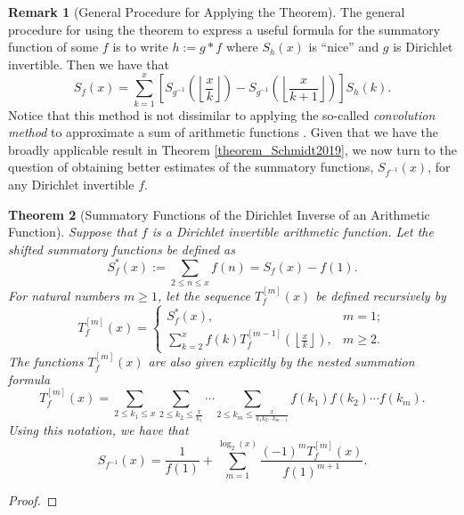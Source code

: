 \documentclass[11pt,reqno]{amsart}
\numberwithin{figure}{section}
\numberwithin{table}{section}
\newcommand{\floor}[1]{\left\lfloor #1 \right\rfloor}
\theoremstyle{plain}
\newtheorem{theorem}{Theorem}
\numberwithin{theorem}{section}
\theoremstyle{definition}
\newtheorem{remark}[theorem]{Remark}
\begin{document}
\begin{remark}[General Procedure for Applying the Theorem]
The general procedure for using the theorem to express a useful formula for the summatory 
function of some $f$ is to write $h := g \ast f$ where $S_h(x)$ is ``nice'' and $g$ is Dirichlet 
invertible. Then we have that 
\begin{equation}
\label{eqn_Sfx_hEQgAstfCvl_ident} 
S_f(x) = \sum_{k=1}^{x} \left[S_{g^{-1}}\left(\floor{\frac{x}{k}}\right) - 
     S_{g^{-1}}\left(\floor{\frac{x}{k+1}}\right)\right] S_h(k). 
\end{equation} 
Notice that this method is not dissimilar to applying the so-called 
\emph{convolution method} to approximate a sum of arithmetic functions 
\cite{TODO-CVLMETHOD-CROOT}. 
Given that we have the broadly applicable result in Theorem \ref{theorem_Schmidt2019}, 
we now turn to the question of obtaining better estimates of the summatory functions, 
$S_{f^{-1}}(x)$, for any Dirichlet invertible $f$. 
\end{remark} 

\begin{theorem}[Summatory Functions of the Dirichlet Inverse of an Arithmetic Function] 
Suppose that $f$ is a Dirichlet invertible arithmetic function. 
Let the shifted summatory functions be defined as 
$$S_f^{\ast}(x) := \sum_{2 \leq n \leq x} f(n) = S_f(x) - f(1).$$ 
For natural numbers $m \geq 1$, let the sequence $T_f^{[m]}(x)$ be defined recursively by 
\[
T_f^{[m]}(x) = \begin{cases} 
     S_f^{\ast}(x), & m = 1; \\ 
     \sum\limits_{k=2}^{x} f(k) T_f^{[m-1]}\left(\floor{\frac{x}{k}}\right), & m \geq 2. 
     \end{cases} 
\]
The functions $T_f^{[m]}(x)$ are also given explicitly by the nested summation formula 
\[
T_f^{[m]}(x) = \sum_{2 \leq k_1 \leq x} \sum_{2 \leq k_2 \leq \frac{x}{k_1}} \cdots 
     \sum_{2 \leq k_m \leq \frac{x}{k_1k_2 \cdots k_{m-1}}} f(k_1) f(k_2) \cdots f(k_m). 
\]
Using this notation, we have that 
\[
S_{f^{-1}}(x) = \frac{1}{f(1)} + \sum_{m=1}^{\log_2(x)} \frac{(-1)^{m} T_f^{[m]}(x)}{f(1)^{m+1}}. 
\]
\end{theorem} 
\begin{proof} 
\end{proof} 
\end{document}
